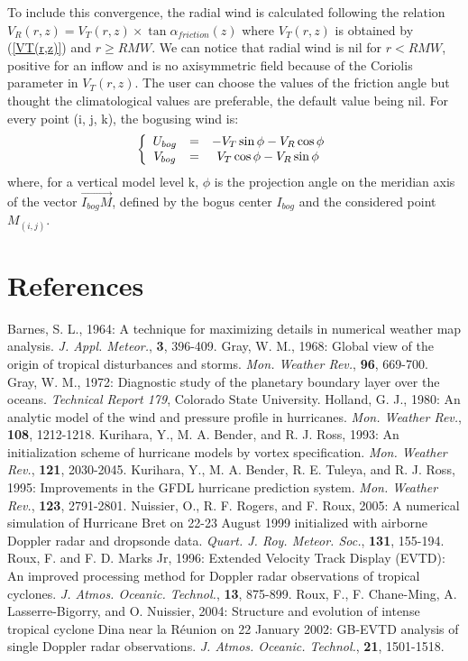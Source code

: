 To include this convergence, the radial wind is calculated following the relation $V_{R}(r,z)=V_{T}(r,z) \times \tan \alpha_{friction}(z)$ where $V_{T}(r,z)$ is obtained by (\ref{VT(r,z)}) and $r \geq RMW$. We can notice that radial wind is nil for $r<RMW$, positive for an inflow and is no axisymmetric field because of the Coriolis parameter in $V_{T}(r,z)$. The user can choose the values of the friction angle but thought the climatological values are preferable, the default value being nil. For every point (i, j, k), the bogusing wind is:
\begin{equation}
\left \lbrace
\begin{array}{c c c}
U_{bog} &=& - V_{T} \sin \phi - V_{R} \cos \phi\\
V_{bog} &=& V_{T} \cos \phi - V_{R} \sin \phi\\
\end{array}
\right .
\end{equation}
where, for a vertical model level k, $\phi$ is the projection angle on the meridian axis of the vector $\overrightarrow{I_{bog}M}$, defined by the bogus center $I_{bog}$ and the considered point $M_{(i,j)}$.

\section{References}
\noindent
\por
Barnes, S. L., 1964:
A technique for maximizing details in numerical weather map analysis. {\it J. Appl. Meteor.}, {\bf 3}, 396-409.
\por
Gray, W. M., 1968:
Global view of the origin of tropical disturbances and storms. {\it Mon. Weather Rev.}, {\bf 96}, 669-700.
\por
Gray, W. M., 1972:
Diagnostic study of the planetary boundary layer over the oceans. {\it Technical Report 179}, Colorado State University.
\por
Holland, G. J., 1980:
An analytic model of the wind and pressure profile in hurricanes.
{\it Mon. Weather Rev.}, {\bf 108}, 1212-1218.
\por 
Kurihara, Y., M. A. Bender, and R. J. Ross, 1993:
An initialization scheme of hurricane models by vortex specification.
{\it Mon. Weather Rev.}, {\bf 121}, 2030-2045.
\por
Kurihara, Y., M. A. Bender, R. E. Tuleya, and R. J. Ross, 1995:
Improvements in the GFDL hurricane prediction system.
{\it Mon. Weather Rev.}, {\bf 123}, 2791-2801.
\por 
Nuissier, O., R. F. Rogers, and F. Roux, 2005:
A numerical simulation of Hurricane Bret on 22-23 August 1999
initialized with airborne Doppler radar and dropsonde data.
{\it Quart. J. Roy. Meteor. Soc.}, {\bf 131}, 155-194.
\por
Roux, F. and F. D. Marks Jr, 1996:
Extended Velocity Track Display (EVTD): An improved processing method for 
Doppler radar observations of tropical cyclones.
{\it J. Atmos. Oceanic. Technol.}, {\bf 13}, 875-899.
\por
Roux, F., F. Chane-Ming, A. Lasserre-Bigorry, and O. Nuissier, 2004:
Structure and evolution of intense tropical cyclone Dina near la R\'eunion on 22 
January 2002: GB-EVTD analysis of single Doppler radar observations.
{\it J. Atmos. Oceanic. Technol.}, {\bf 21}, 1501-1518.


